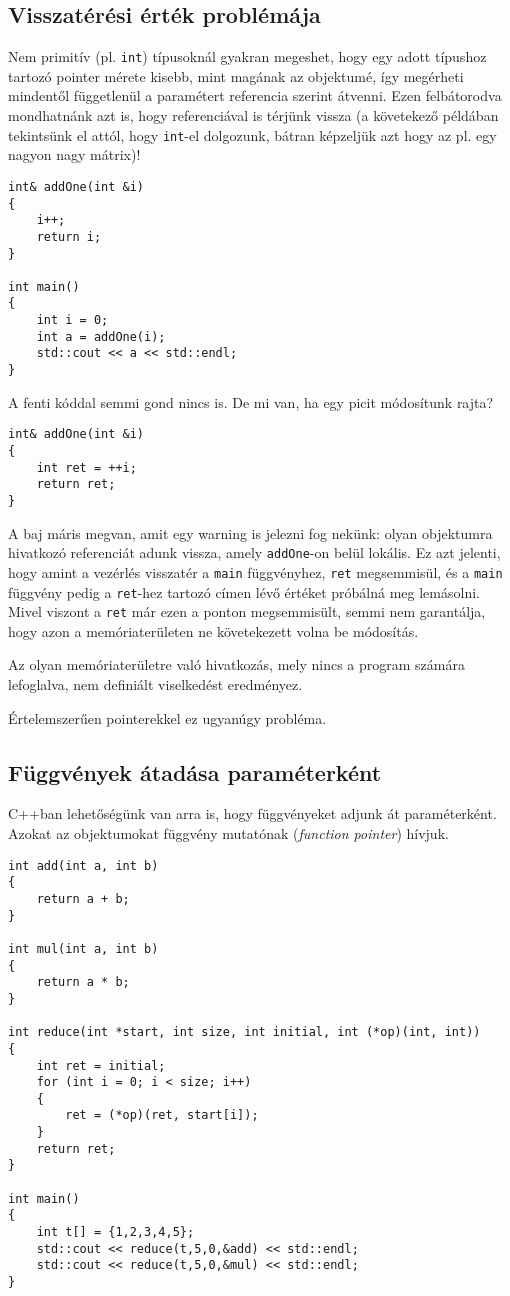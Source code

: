 \documentclass[../cpp_book/cpp_book.tex]{subfiles}
\begin{document}
	\subsection{Visszatérési érték problémája}
	Nem primitív (pl. \texttt{int}) típusoknál gyakran megeshet, hogy egy adott típushoz tartozó pointer mérete kisebb, mint magának az objektumé, így megérheti mindentől függetlenül a paramétert referencia szerint átvenni. Ezen felbátorodva mondhatnánk azt is, hogy referenciával is térjünk vissza (a követekező példában tekintsünk el attól, hogy \texttt{int}-el dolgozunk, bátran képzeljük azt hogy az pl. egy nagyon nagy mátrix)!
	\begin{lstlisting}
int& addOne(int &i)
{
	i++;
	return i;
}

int main()
{
	int i = 0;
	int a = addOne(i);
	std::cout << a << std::endl;
}
	\end{lstlisting}
	A fenti kóddal semmi gond nincs is. De mi van, ha egy picit módosítunk rajta?
	\begin{lstlisting}
int& addOne(int &i)
{
	int ret = ++i;
	return ret;
}
	\end{lstlisting}
	A baj máris megvan, amit egy warning is jelezni fog nekünk: olyan objektumra hivatkozó referenciát adunk vissza, amely \texttt{addOne}-on belül lokális. Ez azt jelenti, hogy amint a vezérlés visszatér a \texttt{main} függvényhez, \texttt{ret} megsemmisül, és a \texttt{main} függvény pedig a \texttt{ret}-hez tartozó címen lévő értéket próbálná meg lemásolni. Mivel viszont a \texttt{ret} már ezen a ponton megsemmisült, semmi nem garantálja, hogy azon a memóriaterületen ne követekezett volna be módosítás.
	
	\medskip
	Az olyan memóriaterületre való hivatkozás, mely nincs a program számára lefoglalva, nem definiált viselkedést eredményez.
	\begin{note}
		Értelemszerűen pointerekkel ez ugyanúgy probléma.
	\end{note}
	\subsection{Függvények átadása paraméterként}
	C++ban lehetőségünk van arra is, hogy függvényeket adjunk át paraméterként. Azokat az objektumokat függvény mutatónak (\textit{function pointer}) hívjuk.
	\begin{lstlisting}
int add(int a, int b)
{
	return a + b;
}

int mul(int a, int b)
{
	return a * b;
}

int reduce(int *start, int size, int initial, int (*op)(int, int))
{
	int ret = initial;
	for (int i = 0; i < size; i++)
	{
		ret = (*op)(ret, start[i]);
	}
	return ret;
}

int main()
{
	int t[] = {1,2,3,4,5};
	std::cout << reduce(t,5,0,&add) << std::endl;
	std::cout << reduce(t,5,0,&mul) << std::endl;
}
	\end{lstlisting}
	
\end{document}
